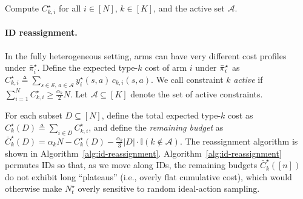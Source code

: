\documentclass[mnsc,nonblindrev]{informs3}
\newcommand{\pibst}{\Bar{\pi}^\star}
\begin{document}
\begin{APPENDICES}
\begin{algorithm}[htbp]
Compute \(C_{k,i}^\star\) for all \(i\in[N]\), \(k\in[K]\), and the active set $\mathcal A$.

\end{algorithm}
\paragraph{ID reassignment.}
In the fully heterogeneous setting, arms can have very different cost profiles under $\bar{\pi}_i^\star$.
Define the expected type-$k$ cost of arm $i$ under $\pibst_i$ as
$
    C_{k,i}^\star \triangleq \sum_{s\in\mathcal{S},\,a\in\mathcal{A}} y_i^\star(s,a)\, c_{k,i}(s,a).
$
We call constraint $k$ \emph{active} if $\sum_{i=1}^N C_{k,i}^\star \ge \frac{\alpha_k}{2}N.$ Let $\mathcal{A}\subseteq[K]$ denote the set of active constraints.




For each subset $D\subseteq[N]$, define the total expected type-$k$ cost as
$C_k^\star(D)\triangleq \sum_{i\in D} C_{k,i}^\star$, and define the \emph{remaining budget} as 
$ 
\bar{C}_k^\star(D) =
\alpha_k N - C_k^\star(D) - \frac{\alpha_k}{3}|D| \cdot \mathbb{I}(k\notin\mathcal{A}).
$
The reassignment algorithm is shown in Algorithm~\ref{alg:id-reassignment}. Algorithm~\ref{alg:id-reassignment} permutes IDs so that, as we move along IDs, the remaining budgets
$\bar{C}_k^\star([n])$ do not exhibit long ``plateaus'' (i.e., overly flat cumulative cost),
which would otherwise make $N_t^\star$ overly sensitive to random ideal-action sampling.


\end{APPENDICES}
\end{document}
